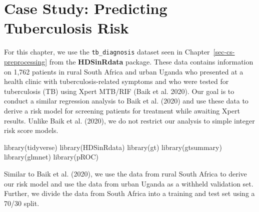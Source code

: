 \documentclass[
  letterpaper,
]{latex/krantz}
\makeatletter
\newenvironment{Shaded}{\begin{snugshade}}{\end{snugshade}}
\newcommand{\FunctionTok}[1]{\textcolor[rgb]{0.28,0.35,0.67}{#1}}
\newcommand{\NormalTok}[1]{\textcolor[rgb]{0.00,0.23,0.31}{#1}}
\newenvironment{kframe}{%
\medskip{}
\setlength{\fboxsep}{.8em}
 \def\at@end@of@kframe{}%
 \ifinner\ifhmode%
  \def\at@end@of@kframe{\end{minipage}}%
  \begin{minipage}{\columnwidth}%
 \fi\fi%
 \def\FrameCommand##1{\hskip\@totalleftmargin \hskip-\fboxsep
 \colorbox{shadecolor}{##1}\hskip-\fboxsep
     \hskip-\linewidth \hskip-\@totalleftmargin \hskip\columnwidth}%
 \MakeFramed {\advance\hsize-\width
   \@totalleftmargin\z@ \linewidth\hsize
   \@setminipage}}%
 {\par\unskip\endMakeFramed%
 \at@end@of@kframe}
\renewenvironment{Shaded}{\begin{kframe}}{\end{kframe}}
\makeatother
\begin{document}
\chapter{Case Study: Predicting Tuberculosis
Risk}\label{sec-cs-regression}

For this chapter, we use the
\texttt{tb\_diagnosis}
dataset seen in Chapter~\ref{sec-cs-preprocessing} from the
\textbf{HDSinRdata} package. These data
contains information on 1,762 patients in rural South Africa and urban
Uganda who presented at a health clinic with tuberculosis-related
symptoms and who were tested for tuberculosis (TB) using Xpert MTB/RIF
(Baik et al. 2020). Our goal is to conduct a similar regression analysis
to Baik et al. (2020) and use these data to derive a risk model for
screening patients for treatment while awaiting Xpert results. Unlike
Baik et al. (2020), we do not restrict our analysis to simple integer
risk score models.

\begin{Shaded}
\begin{Highlighting}[]
\FunctionTok{library}\NormalTok{(tidyverse)}
\FunctionTok{library}\NormalTok{(HDSinRdata)}
\FunctionTok{library}\NormalTok{(gt)}
\FunctionTok{library}\NormalTok{(gtsummary)}
\FunctionTok{library}\NormalTok{(glmnet)}
\FunctionTok{library}\NormalTok{(pROC)}
\end{Highlighting}
\end{Shaded}

Similar to Baik et al. (2020), we use the data from rural South Africa
to derive our risk model and use the data from urban Uganda as a
withheld validation set. Further, we divide the data from South Africa
into a training and test set using a 70/30 split.
\end{document}
